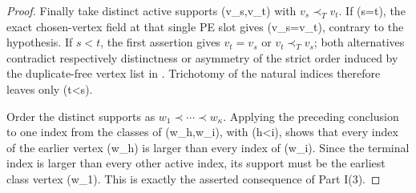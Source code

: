 \begin{proof}
Finally take distinct active supports (v_s,v_t) with
\(v_s\prec_Tv_t\).  If (s=t), the exact chosen-vertex field at that
single PE slot gives (v_s=v_t), contrary to the hypothesis.  If
\(s<t\), the first assertion gives \(v_t=v_s\) or
\(v_t\prec_Tv_s\); both alternatives contradict respectively
distinctness or asymmetry of the strict order induced by the
duplicate-free vertex list in .  Trichotomy of
the natural indices therefore leaves only (t<s).

Order the distinct supports as
\(w_1\prec\cdots\prec w_\kappa\).  Applying the preceding conclusion to
one index from the classes of (w_h,w_i), with (h<i), shows that every
index of the earlier vertex (w_h) is larger than every index of
(w_i).  Since the terminal index is larger than every other active
index, its support must be the earliest class vertex (w_1).  This is
exactly the asserted consequence of Part I(3).
\end{proof}
